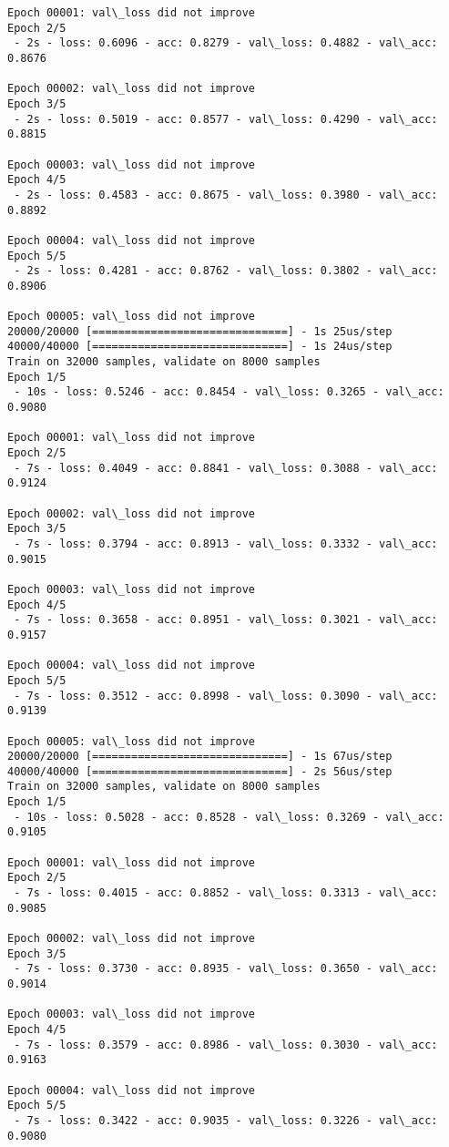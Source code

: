 \documentclass[11pt]{article}
\begin{document}
\begin{Verbatim}[commandchars=\\\{\}]
Epoch 00001: val\_loss did not improve
Epoch 2/5
 - 2s - loss: 0.6096 - acc: 0.8279 - val\_loss: 0.4882 - val\_acc: 0.8676

Epoch 00002: val\_loss did not improve
Epoch 3/5
 - 2s - loss: 0.5019 - acc: 0.8577 - val\_loss: 0.4290 - val\_acc: 0.8815

Epoch 00003: val\_loss did not improve
Epoch 4/5
 - 2s - loss: 0.4583 - acc: 0.8675 - val\_loss: 0.3980 - val\_acc: 0.8892

Epoch 00004: val\_loss did not improve
Epoch 5/5
 - 2s - loss: 0.4281 - acc: 0.8762 - val\_loss: 0.3802 - val\_acc: 0.8906

Epoch 00005: val\_loss did not improve
20000/20000 [==============================] - 1s 25us/step
40000/40000 [==============================] - 1s 24us/step
Train on 32000 samples, validate on 8000 samples
Epoch 1/5
 - 10s - loss: 0.5246 - acc: 0.8454 - val\_loss: 0.3265 - val\_acc: 0.9080

Epoch 00001: val\_loss did not improve
Epoch 2/5
 - 7s - loss: 0.4049 - acc: 0.8841 - val\_loss: 0.3088 - val\_acc: 0.9124

Epoch 00002: val\_loss did not improve
Epoch 3/5
 - 7s - loss: 0.3794 - acc: 0.8913 - val\_loss: 0.3332 - val\_acc: 0.9015

Epoch 00003: val\_loss did not improve
Epoch 4/5
 - 7s - loss: 0.3658 - acc: 0.8951 - val\_loss: 0.3021 - val\_acc: 0.9157

Epoch 00004: val\_loss did not improve
Epoch 5/5
 - 7s - loss: 0.3512 - acc: 0.8998 - val\_loss: 0.3090 - val\_acc: 0.9139

Epoch 00005: val\_loss did not improve
20000/20000 [==============================] - 1s 67us/step
40000/40000 [==============================] - 2s 56us/step
Train on 32000 samples, validate on 8000 samples
Epoch 1/5
 - 10s - loss: 0.5028 - acc: 0.8528 - val\_loss: 0.3269 - val\_acc: 0.9105

Epoch 00001: val\_loss did not improve
Epoch 2/5
 - 7s - loss: 0.4015 - acc: 0.8852 - val\_loss: 0.3313 - val\_acc: 0.9085

Epoch 00002: val\_loss did not improve
Epoch 3/5
 - 7s - loss: 0.3730 - acc: 0.8935 - val\_loss: 0.3650 - val\_acc: 0.9014

Epoch 00003: val\_loss did not improve
Epoch 4/5
 - 7s - loss: 0.3579 - acc: 0.8986 - val\_loss: 0.3030 - val\_acc: 0.9163

Epoch 00004: val\_loss did not improve
Epoch 5/5
 - 7s - loss: 0.3422 - acc: 0.9035 - val\_loss: 0.3226 - val\_acc: 0.9080


\end{Verbatim}
\end{document}
